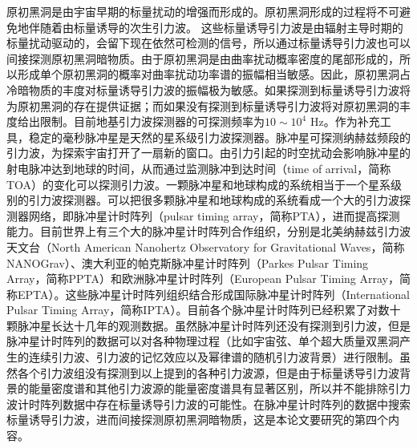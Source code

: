 原初黑洞是由宇宙早期的标量扰动的增强而形成的\citep{Hawking:1971ei,Carr:1974nx}。原初黑洞形成的过程将不可避免地伴随着由标量诱导的次生引力波\citep{Matarrese:1992rp,Matarrese:1993zf,Matarrese:1997ay,Noh:2004bc,Carbone:2004iv,Nakamura:2004rm,Ananda:2006af}。
这些标量诱导引力波是由辐射主导时期的标量扰动驱动的，会留下现在依然可检测的信号，所以通过标量诱导引力波也可以间接探测原初黑洞暗物质\citep{Saito:2008jc,Bugaev:2010bb,Sasaki:2018dmp,Inomata:2018epa,Baumann:2007zm,Clesse:2018ogk,Nakama:2016enz,Saito:2009jt,Bugaev:2009zh,Assadullahi:2009jc}。由于原初黑洞是由曲率扰动概率密度的尾部形成的，所以形成单个原初黑洞的概率对曲率扰动功率谱的振幅相当敏感\citep{Young:2014ana}。因此，原初黑洞占冷暗物质的丰度对标量诱导引力波的振幅极为敏感。如果探测到标量诱导引力波将为原初黑洞的存在提供证据；而如果没有探测到标量诱导引力波将对原初黑洞的丰度给出限制。目前地基引力波探测器的可探测频率为$10\sim10^4$ Hz\citep{Martynov:2016fzi}。作为补充工具，稳定的毫秒脉冲星是天然的星系级引力波探测器。脉冲星可探测纳赫兹频段的引力波，为探索宇宙打开了一扇新的窗口。由引力引起的时空扰动会影响脉冲星的射电脉冲达到地球的时间，从而通过监测脉冲到达时间（time of arrival，简称TOA）的变化可以探测引力波。一颗脉冲星和地球构成的系统相当于一个星系级别的引力波探测器。可以把很多颗脉冲星和地球构成的系统看成一个大的引力波探测器网络，即脉冲星计时阵列（pulsar timing array，简称PTA）\citep{1978SvA....22...36S,Detweiler:1979wn,1990ApJ...361..300F}，进而提高探测能力。目前世界上有三个大的脉冲星计时阵列合作组织，分别是北美纳赫兹引力波天文台（North American Nanohertz Observatory for Gravitational Waves，简称NANOGrav）\citep{McLaughlin:2013ira}、澳大利亚的帕克斯脉冲星计时阵列（Parkes Pulsar Timing Array，简称PPTA）\citep{Manchester:2012za}和欧洲脉冲星计时阵列（European Pulsar Timing Array，简称EPTA）\citep{Assadullahi:2009jc}。这些脉冲星计时阵列组织结合形成国际脉冲星计时阵列（International Pulsar Timing Array，简称IPTA）\citep{2010CQGra..27h4013H}。目前各个脉冲星计时阵列已经积累了对数十颗脉冲星长达十几年的观测数据。虽然脉冲星计时阵列还没有探测到引力波，但是脉冲星计时阵列的数据可以对各种物理过程（比如宇宙弦\citep{Lentati:2015qwp,Arzoumanian:2018saf,Yonemaru:2020bmr}、单个超大质量双黑洞产生的连续引力波\citep{Zhu:2014rta,Babak:2015lua,Aggarwal:2018mgp}、引力波的记忆效应\citep{Wang:2014zls,Aggarwal:2019ypr}以及幂律谱的随机引力波背景\citep{Lentati:2015qwp,Shannon:2015ect,Arzoumanian:2018saf}）进行限制。虽然各个引力波组没有探测到以上提到的各种引力波源，但是由于标量诱导引力波背景的能量密度谱和其他引力波源的能量密度谱具有显著区别\citep{Yuan:2019wwo}，所以并不能排除引力波计时阵列数据中存在标量诱导引力波的可能性。在脉冲星计时阵列的数据中搜索标量诱导引力波，进而间接探测原初黑洞暗物质，这是本论文要研究的第四个内容。

